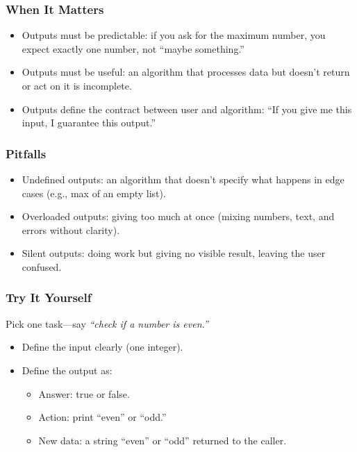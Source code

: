 \documentclass[
  letterpaper,
  DIV=11,
  numbers=noendperiod]{scrreprt}
\providecommand{\tightlist}{%
  \setlength{\itemsep}{0pt}\setlength{\parskip}{0pt}}
\begin{document}
\subsubsection{When It Matters}\label{when-it-matters-12}

\begin{itemize}
\tightlist
\item
  Outputs must be predictable: if you ask for the maximum number, you
  expect exactly one number, not ``maybe something.''
\item
  Outputs must be useful: an algorithm that processes data but doesn't
  return or act on it is incomplete.
\item
  Outputs define the contract between user and algorithm: ``If you give
  me this input, I guarantee this output.''
\end{itemize}

\subsubsection{Pitfalls}\label{pitfalls-11}

\begin{itemize}
\tightlist
\item
  Undefined outputs: an algorithm that doesn't specify what happens in
  edge cases (e.g., max of an empty list).
\item
  Overloaded outputs: giving too much at once (mixing numbers, text, and
  errors without clarity).
\item
  Silent outputs: doing work but giving no visible result, leaving the
  user confused.
\end{itemize}

\subsubsection{Try It Yourself}\label{try-it-yourself-14}

Pick one task---say \emph{``check if a number is even.''}

\begin{itemize}
\item
  Define the input clearly (one integer).
\item
  Define the output as:

  \begin{itemize}
  \tightlist
  \item
    Answer: true or false.
  \item
    Action: print ``even'' or ``odd.''
  \item
    New data: a string ``even'' or ``odd'' returned to the caller.
  \end{itemize}
\end{itemize}
\end{document}
